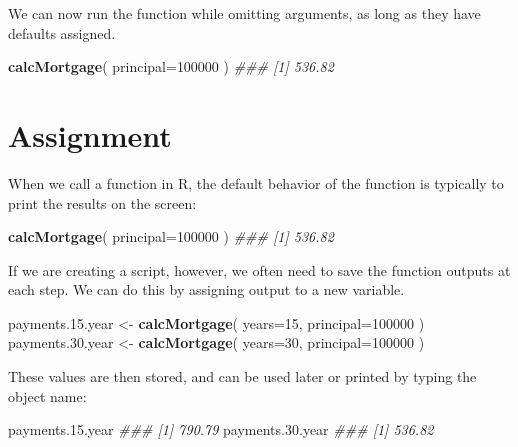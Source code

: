 \documentclass[]{book}
\newenvironment{Shaded}{\begin{snugshade}}{\end{snugshade}}
\newcommand{\CommentTok}[1]{\textcolor[rgb]{0.56,0.35,0.01}{\textit{#1}}}
\newcommand{\DataTypeTok}[1]{\textcolor[rgb]{0.13,0.29,0.53}{#1}}
\newcommand{\DecValTok}[1]{\textcolor[rgb]{0.00,0.00,0.81}{#1}}
\newcommand{\FloatTok}[1]{\textcolor[rgb]{0.00,0.00,0.81}{#1}}
\newcommand{\KeywordTok}[1]{\textcolor[rgb]{0.13,0.29,0.53}{\textbf{#1}}}
\newcommand{\NormalTok}[1]{#1}
\newcommand{\StringTok}[1]{\textcolor[rgb]{0.31,0.60,0.02}{#1}}
\theoremstyle{definition}
\theoremstyle{definition}
\theoremstyle{definition}
\theoremstyle{remark}
\begin{document}
We can now run the function while omitting arguments, as long as they
have defaults assigned.

\begin{Shaded}
\begin{Highlighting}[]
\KeywordTok{calcMortgage}\NormalTok{( }\DataTypeTok{principal=}\DecValTok{100000}\NormalTok{  )}
\CommentTok{### [1] 536.82}
\end{Highlighting}
\end{Shaded}

\hypertarget{assignment}{%
\section{Assignment}\label{assignment}}

When we call a function in R, the default behavior of the function is
typically to print the results on the screen:

\begin{Shaded}
\begin{Highlighting}[]
\KeywordTok{calcMortgage}\NormalTok{( }\DataTypeTok{principal=}\DecValTok{100000}\NormalTok{  )}
\CommentTok{### [1] 536.82}
\end{Highlighting}
\end{Shaded}

If we are creating a script, however, we often need to save the function
outputs at each step. We can do this by assigning output to a new
variable.

\begin{Shaded}
\begin{Highlighting}[]
\NormalTok{payments.}\FloatTok{15.}\NormalTok{year <-}\StringTok{ }\KeywordTok{calcMortgage}\NormalTok{( }\DataTypeTok{years=}\DecValTok{15}\NormalTok{, }\DataTypeTok{principal=}\DecValTok{100000}\NormalTok{  )}
\NormalTok{payments.}\FloatTok{30.}\NormalTok{year <-}\StringTok{ }\KeywordTok{calcMortgage}\NormalTok{( }\DataTypeTok{years=}\DecValTok{30}\NormalTok{, }\DataTypeTok{principal=}\DecValTok{100000}\NormalTok{  )}
\end{Highlighting}
\end{Shaded}

These values are then stored, and can be used later or printed by typing
the object name:

\begin{Shaded}
\begin{Highlighting}[]
\NormalTok{payments.}\FloatTok{15.}\NormalTok{year}
\CommentTok{### [1] 790.79}
\NormalTok{payments.}\FloatTok{30.}\NormalTok{year}
\CommentTok{### [1] 536.82}
\end{Highlighting}
\end{Shaded}
\end{document}
